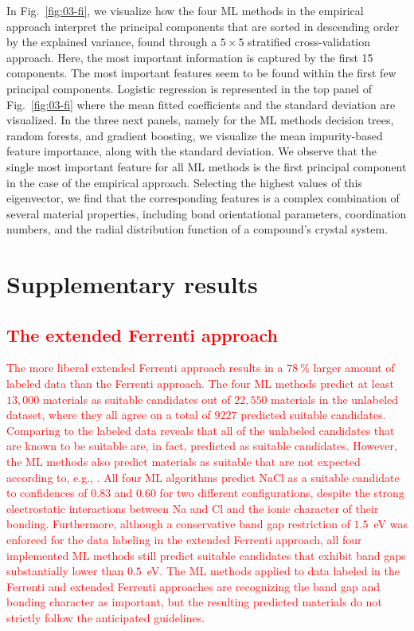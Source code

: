 \documentclass[superscriptaddress,unsortedaddress,
 amsmath,amssymb,
 aps,
]{revtex4-2}
\newcommand{\mrk}[1]{\textcolor{red}{#1}}
\begin{document}
In Fig.~\ref{fig:03-fi}, we visualize how the four  ML methods in the empirical approach interpret the principal components that are sorted in descending order by the explained variance, found through a $5\times 5$ stratified cross-validation approach.  
Here, the most important information is captured by the first 15 components. The most important features seem to be found within the first few principal  components. 
Logistic regression is represented in the top panel of Fig.~\ref{fig:03-fi} where the mean fitted coefficients and the standard deviation are visualized. In the three next panels, namely for the ML methods decision trees, random forests, and gradient boosting, we visualize the mean impurity-based feature importance, along with the standard deviation. We observe that the single most important feature for all ML methods is the first principal component in the case of the empirical approach. Selecting the highest values of this eigenvector, we find that the corresponding features is a complex combination of several material properties, including bond orientational parameters, coordination numbers, and the radial distribution function of a compound's crystal system. 




\section*{Supplementary results} 

\subsection*{\mrk{The extended Ferrenti approach}}

\mrk{The more liberal extended Ferrenti approach results in a $78 \ \%$ larger 
amount of labeled data than the Ferrenti approach.  
The four ML methods predict at least $13,000$ materials as suitable candidates out of $22,550$ materials in the unlabeled dataset, where they all agree on a total of $9227$ predicted suitable candidates. Comparing to the labeled data reveals that all of the unlabeled candidates that are known to be suitable are, in fact, predicted as suitable candidates. However, the ML methods also predict materials as suitable that are not expected according to, e.g., \citeauthor{Weber2010} \cite{Weber2010}. 
All four ML algorithms predict NaCl as a suitable candidate to confidences of $0.83$ and $0.60$ for two different configurations, despite the strong electrostatic interactions between Na and Cl and the ionic character of their bonding.  
Furthermore, although a conservative band gap restriction of $1.5$~eV was enforced for the data labeling in the extended Ferrenti approach, all four implemented ML methods still predict suitable candidates that exhibit band gaps substantially lower than $0.5$~eV.  
The ML methods applied to data labeled in the Ferrenti and extended Ferrenti approaches are recognizing the band gap and bonding character as important, but the resulting predicted materials do not strictly follow the anticipated guidelines. }
\end{document}
